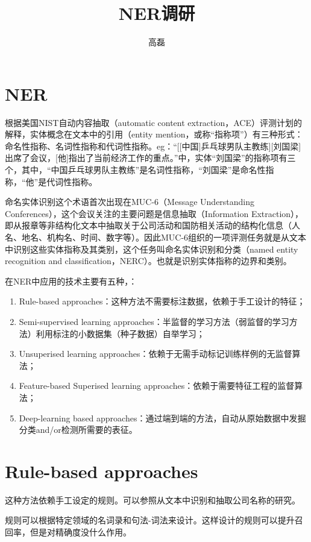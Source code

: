 \documentclass[a4paper,UTF8,no-math]{ctexart}
\title{NER调研}
\author{高磊}
\date{\zhtoday}
\begin{document}
	\section{NER}
	
	根据美国NIST自动内容抽取（automatic content extraction，ACE）评测计划的解释，实体概念在文本中的引用（entity mention，或称“指称项”）有三种形式：命名性指称、名词性指称和代词性指称。eg：“[[中国]乒乓球男队主教练][刘国梁]出席了会议，[他]指出了当前经济工作的重点。”中，实体“刘国梁”的指称项有三个，其中，“中国乒乓球男队主教练”是名词性指称，“刘国梁”是命名性指称，“他”是代词性指称。
	
	命名实体识别这个术语首次出现在MUC-6（Message Understanding Conferences），这个会议关注的主要问题是信息抽取（Information Extraction），即从报章等非结构化文本中抽取关于公司活动和国防相关活动的结构化信息（人名、地名、机构名、时间、数字等）。因此MUC-6组织的一项评测任务就是从文本中识别这些实体指称及其类别，这个任务叫命名实体识别和分类（named entity recognition and classification，NERC）。也就是识别实体指称的边界和类别。
	
	
	在NER中应用的技术主要有五种\citep{nadeau2007survey}，\citep{li2018survey}：
	
	\begin{enumerate}
		\item Rule-based approaches：这种方法不需要标注数据，依赖于手工设计的特征；
		\item Semi-supervised learning approaches：半监督的学习方法（弱监督的学习方法）利用标注的小数据集（种子数据）自举学习；
		\item Unsuperised learning approaches：依赖于无需手动标记训练样例的无监督算法；
		\item Feature-based Superised learning approaches：依赖于需要特征工程的监督算法；
		\item Deep-learning based approaches：通过端到端的方法，自动从原始数据中发掘分类and/or检测所需要的表征。
	\end{enumerate}
	
	\section{Rule-based approaches}
	
	这种方法依赖手工设定的规则。可以参照\citep{rau1991extracting}从文本中识别和抽取公司名称的研究。
	
	规则可以根据特定领域的名词录和句法-词法来设计。这样设计的规则可以提升召回率，但是对精确度没什么作用。
	
\end{document}
